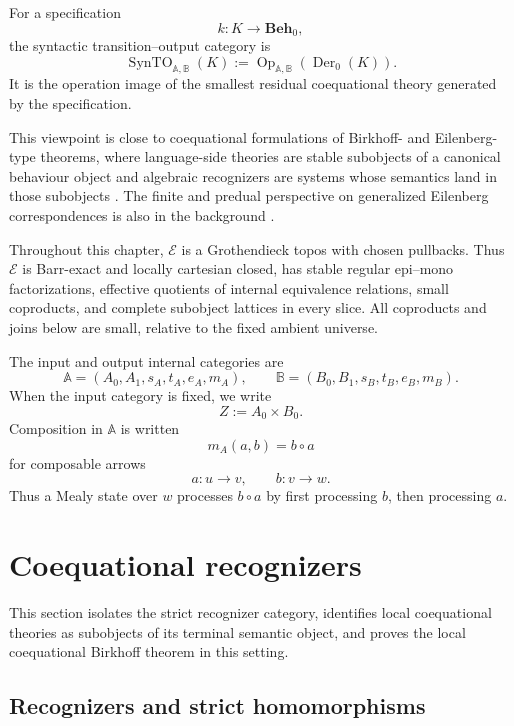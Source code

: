 For a specification
\[
    k:K\to\mathbf{Beh}_0,
\]
the syntactic transition--output category is
\[
    \operatorname{SynTO}_{\mathbb A,\mathbb B}(K)
    :=
    \operatorname{Op}_{\mathbb A,\mathbb B}(\operatorname{Der}_0(K)).
\]
It is the operation image of the smallest residual coequational theory
generated by the specification.

This viewpoint is close to coequational formulations of Birkhoff- and
Eilenberg-type theorems, where language-side theories are stable subobjects of
a canonical behaviour object and algebraic recognizers are systems whose
semantics land in those subobjects
\cite{Salamanca2017Unveiling,Salamanca2016Monad}. The finite and predual
perspective on generalized Eilenberg correspondences is also in the background
\cite{AdamekMiliusMyersUrbat2015Local,AdamekMiliusMyersUrbat2019TOCL}.

\begin{assumption}
\label{ass:coeq-grothendieck-topos}
    Throughout this chapter, \(\mathcal E\) is a Grothendieck topos with chosen
    pullbacks. Thus \(\mathcal E\) is Barr-exact and locally cartesian closed,
    has stable regular epi--mono factorizations, effective quotients of internal
    equivalence relations, small coproducts, and complete subobject lattices in
    every slice. All coproducts and joins below are small, relative to the fixed
    ambient universe.
\end{assumption}

The input and output internal categories are
\[
    \mathbb A=(A_0,A_1,s_A,t_A,e_A,m_A),
    \qquad
    \mathbb B=(B_0,B_1,s_B,t_B,e_B,m_B).
\]
When the input category is fixed, we write
\[
    Z:=A_0\times B_0.
\]
Composition in \(\mathbb A\) is written
\[
    m_A(a,b)=b\circ a
\]
for composable arrows
\[
    a:u\to v,
    \qquad
    b:v\to w.
\]
Thus a Mealy state over \(w\) processes \(b\circ a\) by first processing \(b\),
then processing \(a\).

\section{Coequational recognizers}
\label{sec:coequational-recognizers}

This section isolates the strict recognizer category, identifies local
coequational theories as subobjects of its terminal semantic object, and proves
the local coequational Birkhoff theorem in this setting.

\subsection{Recognizers and strict homomorphisms}
\label{subsec:recognizers-strict-homomorphisms}

